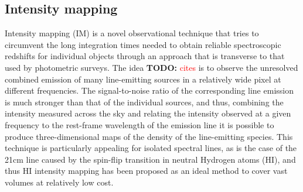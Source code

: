 \documentclass[prd,twocolumn]{revtex4}
\newcommand{\TODO}[1]{{\bf TODO:} \textcolor{red}{#1}}
\begin{document}
  \subsection{Intensity mapping}\label{ssec:method.imap}
    \begin{table}
      \caption{Experimental specifications assumed for SKA and HIRAX.}
      \label{tab:im_exp}
    \end{table}
    Intensity mapping (IM) is a novel observational technique that tries to circumvent the
    long integration times needed to obtain reliable spectroscopic redshifts for individual
    objects through an approach that is transverse to that used by photometric surveys.
    The idea \TODO{cites} is to observe the unresolved combined emission of many line-emitting
    sources in a relatively wide pixel at different frequencies. The signal-to-noise ratio
    of the corresponding line emission is much stronger than that of the individual sources,
    and thus, combining the intensity measured across the sky and relating the intensity
    observed at a given frequency to the rest-frame wavelength of the emission line it is
    possible to produce three-dimensional maps of the density of the line-emitting species.
    This technique is particularly appealing for isolated spectral lines, as is the case
    of the 21cm line caused by the spin-flip transition in neutral Hydrogen atoms (HI),
    and thus HI intensity mapping has been proposed as an ideal method to cover vast
    volumes at relatively low cost.
    
\end{document}
